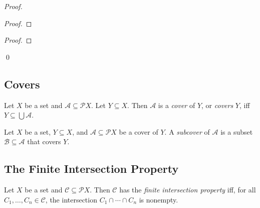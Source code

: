 \begin{proof}
  \pf
  \begin{proof}
  \end{proof}
  \begin{proof}
  \end{proof}
  \qed
\end{proof}

\subsection{Covers}

\begin{df}[Cover]
  Let $X$ be a set and $\mathcal{A} \subseteq \mathcal{P} X$. Let $Y \subseteq X$. Then $\mathcal{A}$ is a \emph{cover} of $Y$, or \emph{covers} $Y$, iff $Y \subseteq \bigcup \mathcal{A}$.
\end{df}

\begin{df}[Subcover]
  Let $X$ be a set, $Y \subseteq X$, and $\mathcal{A} \subseteq \mathcal{P} X$ be a cover of $Y$. A \emph{subcover} of $\mathcal{A}$ is a subset $\mathcal{B} \subseteq \mathcal{A}$ that covers $Y$.
\end{df}

\subsection{The Finite Intersection Property}

\begin{df}
  Let $X$ be a set and $\mathcal{C} \subseteq \mathcal{P} X$. Then $\mathcal{C}$ has the \emph{finite intersection property} iff, for all $C_1, \ldots, C_n \in \mathcal{C}$, the intersection $C_1 \cap \cdots \cap C_n$ is nonempty.
\end{df}

